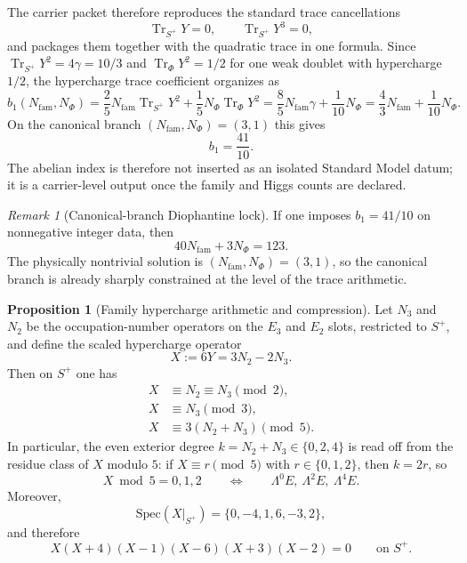 \documentclass[11pt,a4paper]{article}
\theoremstyle{definition}
\newtheorem{proposition}[theorem]{Proposition}
\theoremstyle{remark}
\newtheorem*{remark}{Remark}
\DeclareMathOperator{\tr}{Tr}
\newcommand{\bone}{b_1}
\begin{document}
The carrier packet therefore reproduces the standard trace cancellations
\[
\tr_{S^+}Y=0,
\qquad
\tr_{S^+}Y^3=0,
\]
and packages them together with the quadratic trace in one formula. Since $\tr_{S^+}Y^2=4\gamma=10/3$ and $\tr_\Phi Y^2=1/2$ for one weak doublet with hypercharge $1/2$, the hypercharge trace coefficient organizes as
\begin{equation}
\label{eq:abelian-index}
\bone(N_{\mathrm{fam}},N_\Phi)
=
\frac25N_{\mathrm{fam}}\tr_{S^+}Y^2+\frac15N_\Phi\tr_\Phi Y^2
=
\frac85N_{\mathrm{fam}}\gamma+\frac1{10}N_\Phi
=
\frac43N_{\mathrm{fam}}+\frac1{10}N_\Phi.
\end{equation}
On the canonical branch $(N_{\mathrm{fam}},N_\Phi)=(3,1)$ this gives
\[
\bone=\frac{41}{10}.
\]
The abelian index is therefore not inserted as an isolated Standard Model datum; it is a carrier-level output once the family and Higgs counts are declared.

\begin{remark}[Canonical-branch Diophantine lock]
If one imposes $\bone=41/10$ on nonnegative integer data, then
\[
40N_{\mathrm{fam}}+3N_\Phi=123.
\]
The physically nontrivial solution is $(N_{\mathrm{fam}},N_\Phi)=(3,1)$, so the canonical branch is already sharply constrained at the level of the trace arithmetic.
\end{remark}

\begin{proposition}[Family hypercharge arithmetic and compression]
\label{prop:family-hypercharge-compression}
Let $N_3$ and $N_2$ be the occupation-number operators on the $E_3$ and $E_2$ slots, restricted to $S^+$, and define the scaled hypercharge operator
\[
X:=6Y=3N_2-2N_3.
\]
Then on $S^+$ one has
\begin{align}
X&\equiv N_2\equiv N_3 \pmod 2,\label{eq:x-mod-2}\\
X&\equiv N_3 \pmod 3,\label{eq:x-mod-3}\\
X&\equiv 3(N_2+N_3) \pmod 5.\label{eq:x-mod-5}
\end{align}
In particular, the even exterior degree $k=N_2+N_3\in\{0,2,4\}$ is read off from the residue class of $X$ modulo $5$: if $X\equiv r\pmod 5$ with $r\in\{0,1,2\}$, then $k=2r$, so
\[
X\bmod 5=0,1,2
\qquad\Longleftrightarrow\qquad
\Lambda^0E,\ \Lambda^2E,\ \Lambda^4E.
\]
Moreover,
\[
\mathrm{Spec}(X|_{S^+})=\{0,-4,1,6,-3,2\},
\]
and therefore
\begin{equation}
\label{eq:family-x-polynomial}
X(X+4)(X-1)(X-6)(X+3)(X-2)=0
\qquad\text{on }S^+.
\end{equation}
\end{proposition}
\end{document}
